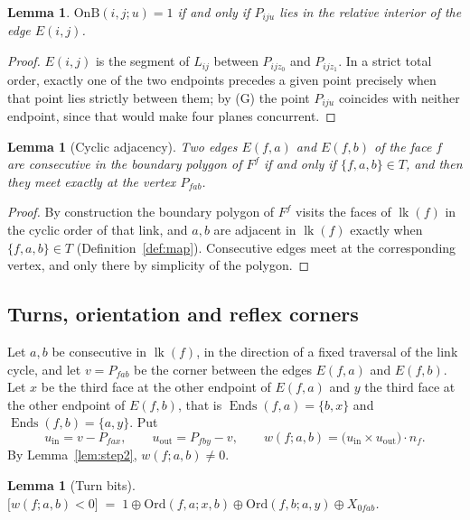 \documentclass[11pt,reqno]{amsart}
\theoremstyle{plain}
\newtheorem{lemma}[theorem]{Lemma}
\theoremstyle{definition}
\newcommand{\Ends}{\operatorname{Ends}}
\newcommand{\link}{\operatorname{lk}}
\newcommand{\OnB}{\mathrm{OnB}}
\newcommand{\Ord}{\mathrm{Ord}}
\newcommand{\xor}{\oplus}
\begin{document}
\begin{lemma}\label{lem:onb}
$\OnB(i,j;u)=1$ if and only if $P_{iju}$ lies in the relative interior of the edge $E(i,j)$.
\end{lemma}

\begin{proof}
$E(i,j)$ is the segment of $L_{ij}$ between $P_{ijz_0}$ and $P_{ijz_1}$. In a strict total order,
exactly one of the two endpoints precedes a given point precisely when that point lies strictly
between them; by (G) the point $P_{iju}$ coincides with neither endpoint, since that would make four
planes concurrent.
\end{proof}

\begin{lemma}[Cyclic adjacency]\label{lem:adjacency}
Two edges $E(f,a)$ and $E(f,b)$ of the face $f$ are consecutive in the boundary polygon of $F^f$ if
and only if $\{f,a,b\}\in T$, and then they meet exactly at the vertex $P_{fab}$.
\end{lemma}

\begin{proof}
By construction the boundary polygon of $F^f$ visits the faces of $\link(f)$ in the cyclic order of
that link, and $a,b$ are adjacent in $\link(f)$ exactly when $\{f,a,b\}\in T$
(Definition~\ref{def:map}). Consecutive edges meet at the corresponding vertex, and only there by
simplicity of the polygon.
\end{proof}

\subsection{Turns, orientation and reflex corners}
Let $a,b$ be consecutive in $\link(f)$, in the direction of a fixed traversal of the link cycle, and
let $v=P_{fab}$ be the corner between the edges $E(f,a)$ and $E(f,b)$. Let $x$ be the third face at the
other endpoint of $E(f,a)$ and $y$ the third face at the other endpoint of $E(f,b)$, that is
$\Ends(f,a)=\{b,x\}$ and $\Ends(f,b)=\{a,y\}$. Put
\[
   u_{\mathrm{in}}=v-P_{fax},\qquad u_{\mathrm{out}}=P_{fby}-v,\qquad
   w(f;a,b)=\big(u_{\mathrm{in}}\times u_{\mathrm{out}}\big)\cdot n_f .
\]
By Lemma~\ref{lem:step2}, $w(f;a,b)\ne0$.

\begin{lemma}[Turn bits]\label{lem:turn}
$\big[w(f;a,b)<0\big]\;=\;1\xor\Ord(f,a;x,b)\xor\Ord(f,b;a,y)\xor X_{0fab}$.
\end{lemma}
\end{document}
